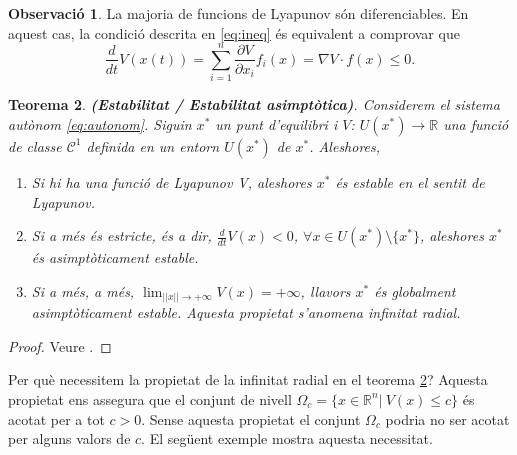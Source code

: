 \documentclass[11pt,a4paper,openright,oneside]{article}
\numberwithin{equation}{section}
\newtheorem{teo}{Teorema}[section]
\theoremstyle{definition}
\newtheorem{obs}[teo]{Observaci\'o}
\begin{document}
\begin{obs}
    La majoria de funcions de Lyapunov són diferenciables. En aquest cas, la condició descrita en \eqref{eq:ineq} és equivalent a comprovar que \begin{equation}
        \frac{d}{dt}V\left(x(t)\right)=\sum_{i=1}^{n}\frac{\partial V}{\partial x_i}f_i(x)=\nabla{V} \cdot f(x) \leq0.
    \end{equation}
\end{obs}

\begin{teo} \label{teo:lyapunov}
    \textbf{(Estabilitat / Estabilitat asimptòtica)}. Considerem el sistema autònom \eqref{eq:autonom}. Siguin $x^{*}$ un punt d'equilibri i $V$: $U\left(x^{*}\right)\rightarrow{\mathbb{R}}$ una funció de classe $\mathcal{C}^{1}$ definida en un entorn $U\left(x^{*}\right)$ de $x^{*}$. Aleshores, 
    \begin{enumerate}
        \item Si hi ha una funció de Lyapunov V, aleshores $x^{*}$ és estable en el sentit de Lyapunov.
        \item Si a més és estricte, és a dir, $\frac{d}{dt}V(x)<0$, $\forall x\in U(x^*)\setminus \{x^*\}$, aleshores $x^{*}$ és asimptòticament estable.
        \item \text Si a més, a més, $\lim_{|| x || \to +\infty}V(x)=+\infty$, llavors $x^{*}$ és globalment asimptòticament estable. Aquesta propietat s'anomena infinitat radial.
    \end{enumerate}
\end{teo}

\begin{proof}
    Veure \cite{Lyapunov}.
\end{proof}

Per què necessitem la propietat de la infinitat radial en el teorema \ref{teo:lyapunov}? Aquesta propietat ens assegura que el conjunt de nivell $\Omega_c=\{x\in \mathbb{R}^n|\ V(x)\leq c\}$ és acotat per a tot $c>0$. Sense aquesta propietat el conjunt $\Omega_c$ podria no ser acotat per alguns valors de $c$. El següent exemple mostra aquesta necessitat.
\end{document}
